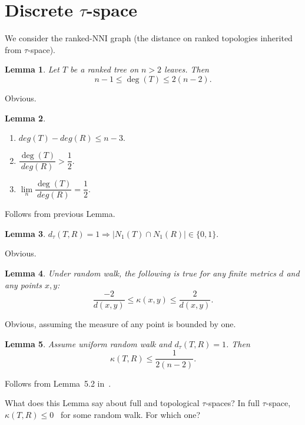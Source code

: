 \documentclass{amsart}
\newtheorem{lemma}{Lemma}
\begin{document}
\section{Discrete $\tau$-space}

We consider the ranked-NNI graph (the distance on ranked topologies inherited from 
$\tau$-space). 

\begin{lemma}
Let $T$ be a ranked tree on $n>2$ leaves. Then \[n-1\leq \deg(T)\leq2(n-2).\] 
\end{lemma}

\proof
Obvious. 
\endproof

\begin{lemma}
\begin{enumerate}[(1)]
\item $deg(T)-deg(R) \leq n-3.$
\item $\dfrac{\deg(T)}{deg(R)}>\dfrac12.$
\item $\lim\limits_n\dfrac{\deg(T)}{deg(R)}=\dfrac{1}{2}.$
\end{enumerate}
\end{lemma}

\proof
Follows from previous Lemma. 
\endproof

\begin{lemma}
$d_{\tau}(T,R) = 1 \Rightarrow |N_1(T)\cap N_1(R)|\in\{0,1\}.$
\end{lemma}

\proof
Obvious.
\endproof

\begin{lemma}
Under random walk, the following is true for any finite metrics $d$ and any points $x,y$:
\[
\dfrac{-2}{d(x,y)} \leq \kappa(x,y) \leq \dfrac{2}{d(x,y)}.
\]
\end{lemma}

\proof
Obvious, assuming the measure of any point is bounded by one. 
\endproof


\begin{lemma}
Assume uniform random walk and $d_\tau(T,R) = 1$. Then \[\kappa(T,R) \leq 
\dfrac{1}{2(n-2)}.\]
\end{lemma}

\proof
Follows from Lemma~5.2 in~\cite{WhiddenMatsen}. 
\endproof

What does this Lemma say about full and topological $\tau$-spaces? In full $\tau$-space,
$\kappa(T,R) \leq 0$~\cite{GD} for some random walk. For which one? 
\end{document}
